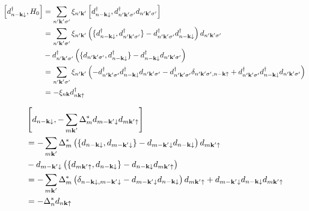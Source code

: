\begin{align}
    \left[ d_{n -\bm{\mathrm{k}} \downarrow}^{\dagger}, H_0 \right]
    &= \sum_{n^{\prime} \bm{\mathrm{k}}^{\prime} \sigma^{\prime}} \xi_{n^{\prime} \bm{\mathrm{k}}^{\prime}} \left[ d_{n -\bm{\mathrm{k}} \downarrow}^{\dagger}, d_{n^{\prime} \bm{\mathrm{k}}^{\prime} \sigma^{\prime}}^{\dagger} d_{n^{\prime} \bm{\mathrm{k}}^{\prime} \sigma^{\prime}} \right] \\
    &= \sum_{n^{\prime} \bm{\mathrm{k}}^{\prime} \sigma^{\prime}} \xi_{n^{\prime} \bm{\mathrm{k}}^{\prime}}
    \left(
        \{d_{n -\bm{\mathrm{k}} \downarrow}^{\dagger}, d_{n^{\prime} \bm{\mathrm{k}}^{\prime} \sigma^{\prime}}^{\dagger} \} - d_{n^{\prime} \bm{\mathrm{k}}^{\prime} \sigma^{\prime}}^{\dagger} d_{n -\bm{\mathrm{k}} \downarrow}^{\dagger}
    \right) d_{n^{\prime} \bm{\mathrm{k}}^{\prime} \sigma^{\prime}} \\
    &- d_{n^{\prime} \bm{\mathrm{k}}^{\prime} \sigma^{\prime}}^{\dagger}
    \left(
        \{ d_{n^{\prime} \bm{\mathrm{k}}^{\prime} \sigma^{\prime}}, d_{n -\bm{\mathrm{k}} \downarrow}^{\dagger} \} - d_{n -\bm{\mathrm{k}} \downarrow}^{\dagger} d_{n^{\prime} \bm{\mathrm{k}}^{\prime} \sigma^{\prime}}
    \right) \\
    &= \sum_{n^{\prime} \bm{\mathrm{k}}^{\prime} \sigma^{\prime}} \xi_{n^{\prime} \bm{\mathrm{k}}^{\prime}}
    \left(- d_{n^{\prime} \bm{\mathrm{k}}^{\prime} \sigma^{\prime}}^{\dagger} d_{n -\bm{\mathrm{k}} \downarrow}^{\dagger} d_{n^{\prime} \bm{\mathrm{k}}^{\prime} \sigma^{\prime}}
    - d_{n^{\prime} \bm{\mathrm{k}}^{\prime} \sigma^{\prime}}^{\dagger}
    \delta_{n^{\prime} \bm{\mathrm{k}}^{\prime} \sigma^{\prime}, n -\bm{\mathrm{k}} \uparrow}
    + d_{n^{\prime} \bm{\mathrm{k}}^{\prime} \sigma^{\prime}}^{\dagger} d_{n -\bm{\mathrm{k}} \downarrow}^{\dagger} d_{n^{\prime} \bm{\mathrm{k}}^{\prime} \sigma^{\prime}} \right) \\
    &= - \xi_{n \bm{\mathrm{k}}} d_{n \bm{\mathrm{k}} \uparrow}^{\dagger}
\end{align}

\begin{align}
    &\left[d_{n -\bm{\mathrm{k}} \downarrow}, -\sum_{m \bm{\mathrm{k}}^{\prime}} \Delta_{m}^* d_{m -\bm{\mathrm{k}}^{\prime} \downarrow} d_{m \bm{\mathrm{k}}^{\prime} \uparrow} \right] \\
    &= -\sum_{m \bm{\mathrm{k}}^{\prime}} \Delta_{m}^*
    \left(\{d_{n -\bm{\mathrm{k}} \downarrow}, d_{m -\bm{\mathrm{k}}^{\prime} \downarrow}\} - d_{m -\bm{\mathrm{k}}^{\prime} \downarrow} d_{n -\bm{\mathrm{k}} \downarrow} \right) d_{m \bm{\mathrm{k}}^{\prime} \uparrow} \\
    &- d_{m -\bm{\mathrm{k}}^{\prime} \downarrow} \left(\{ d_{m \bm{\mathrm{k}}^{\prime} \uparrow}, d_{n -\bm{\mathrm{k}} \downarrow}\} - d_{n -\bm{\mathrm{k}} \downarrow} d_{m \bm{\mathrm{k}}^{\prime} \uparrow} \right) \\
    &= -\sum_{m \bm{\mathrm{k}}^{\prime}} \Delta_{m}^* \left( \delta_{n -\bm{\mathrm{k}} \downarrow, m -\bm{\mathrm{k}}^{\prime} \downarrow} - d_{m -\bm{\mathrm{k}}^{\prime} \downarrow} d_{n -\bm{\mathrm{k}} \downarrow} \right) d_{m \bm{\mathrm{k}}^{\prime} \uparrow} + d_{m -\bm{\mathrm{k}}^{\prime} \downarrow} d_{n -\bm{\mathrm{k}} \downarrow} d_{m \bm{\mathrm{k}}^{\prime} \uparrow} \\
    &= - \Delta_n^* d_{n \bm{\mathrm{k}} \uparrow}
\end{align}

